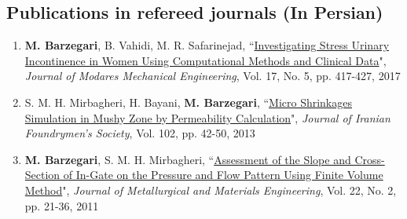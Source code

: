 \documentclass{cv}
\begin{document}
\subsection{Publications in refereed journals (In Persian)}
\begin{enumerate}
\item
\textbf{M. Barzegari}, B. Vahidi, M. R. Safarinejad, ``\href{http://mme.modares.ac.ir/article_16771_en.html}{Investigating Stress Urinary Incontinence in Women Using Computational Methods and Clinical Data}", \textit{Journal of Modares Mechanical Engineering}, Vol. 17, No. 5, pp. 417-427, 2017 %
\item
S. M. H. Mirbagheri, H. Bayani, \textbf{M. Barzegari}, ``\href{https://1drv.ms/b/s!Av7P45pSaDtYgUnsN3LHLbiNHomt}{Micro Shrinkages Simulation in Mushy Zone by Permeability Calculation}", \textit{Journal of Iranian Foundrymen's Society}, Vol. 102, pp. 42-50, 2013 %
\item
\textbf{M. Barzegari}, S. M. H. Mirbagheri, ``\href{http://jmme.um.ac.ir/index.php/metallurgical/article/view/10905}{Assessment of the Slope and Cross-Section of In-Gate on the Pressure and Flow Pattern Using Finite Volume Method}", \textit{Journal of Metallurgical and Materials Engineering}, Vol. 22, No. 2, pp. 21-36, 2011 %
\end{enumerate}
\end{document}
